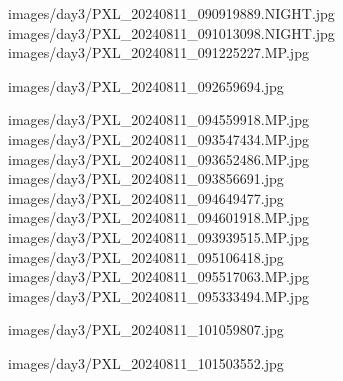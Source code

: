 %

                   {images/day3/PXL_20240811_090919889.NIGHT.jpg}
                   {images/day3/PXL_20240811_091013098.NIGHT.jpg}
                   {images/day3/PXL_20240811_091225227.MP.jpg}
%

                      {images/day3/PXL_20240811_092659694.jpg}
%

                     {images/day3/PXL_20240811_094559918.MP.jpg}
                     {images/day3/PXL_20240811_093547434.MP.jpg}
                     {images/day3/PXL_20240811_093652486.MP.jpg}
                     {images/day3/PXL_20240811_093856691.jpg}
                     {images/day3/PXL_20240811_094649477.jpg}
                     {images/day3/PXL_20240811_094601918.MP.jpg}
                     {images/day3/PXL_20240811_093939515.MP.jpg}
                     {images/day3/PXL_20240811_095106418.jpg}
%
                      {images/day3/PXL_20240811_095517063.MP.jpg}
                      {images/day3/PXL_20240811_095333494.MP.jpg}

%

                     {images/day3/PXL_20240811_101059807.jpg}
%

                     {images/day3/PXL_20240811_101503552.jpg}
%


%

\pagestyle{fancy} %